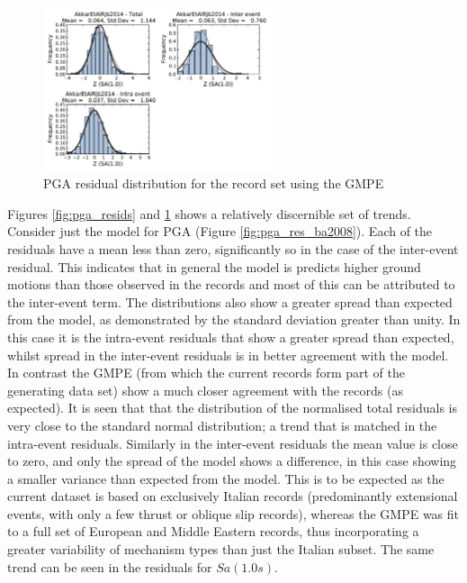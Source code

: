 \begin{figure}[htb]
	\centering
		\includegraphics[width=0.6\textwidth]{./figures/residuals/Akkar2014_Residuals_Sa1.pdf}
	\caption{PGA residual distribution for the record set using the \cite{Akkar_etal2014} GMPE}
	\label{fig:sa1_res_akkar2014}
\end{figure}

Figures \ref{fig:pga_resids} and \ref{fig:sa1_res_akkar2014} shows a relatively discernible set of trends. Consider just the \cite{boore2008} model for PGA (Figure \ref{fig:pga_res_ba2008}). Each of the residuals have a mean less than zero, significantly so in the case of the inter-event residual. This indicates that in general the \cite{boore2008} model is predicts higher ground motions than those observed in the records and most of this can be attributed to the inter-event term. The distributions also show a greater spread than expected from the model, as demonstrated by the standard deviation greater than unity. In this case it is the intra-event residuals that show a greater spread than expected, whilst spread in the inter-event residuals is in better agreement with the model. In contrast the \cite{Akkar_etal2014} GMPE (from which the current records form part of the generating data set) show a much closer agreement with the records (as expected). It is seen that that the distribution of the normalised total residuals is very close to the standard normal distribution; a trend that is matched in the intra-event residuals. Similarly in the inter-event residuals the mean value is close to zero, and only the spread of the model shows a difference, in this case showing a smaller variance than expected from the model. This is to be expected as the current dataset is based on exclusively Italian records (predominantly extensional events, with only a few thrust or oblique slip records), whereas the GMPE was fit to a full set of European and Middle Eastern records, thus incorporating a greater variability of mechanism types than just the Italian subset. The same trend can be seen in the residuals for $Sa \left( {1.0 s} \right)$. 

